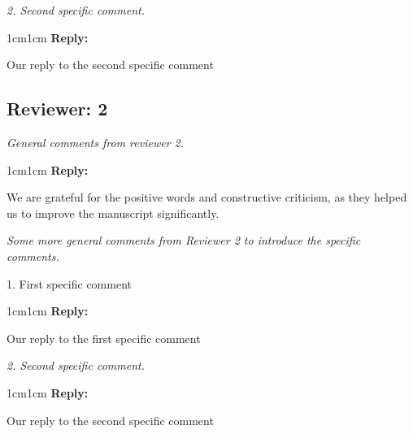 \documentclass[11pt]{article}
\newenvironment{reviewer}{\itshape}{}
\newenvironment{reply}{%
    \begin{adjustwidth}{1cm}{1cm}%
    \color{grayreply}\textbf{Reply:\ }%
    \ignorespaces%
}{\end{adjustwidth}}
\begin{document}
\begin{minipage}{\linewidth}
    \begin{reviewer}
        2. Second specific comment.
    \end{reviewer}

    \begin{reply}
        Our reply to the second specific comment
    \end{reply}
\end{minipage}

\subsection*{Reviewer: 2}

\begin{minipage}{\linewidth}
    \begin{reviewer}
        General comments from reviewer 2.
    \end{reviewer}

    \begin{reply}
        We are grateful for the positive words and constructive criticism, as they helped us to improve the manuscript significantly.
    \end{reply}
\end{minipage}


\begin{minipage}{\linewidth}
    \begin{reviewer}
        Some more general comments from Reviewer 2 to introduce the specific comments.

        1. First specific comment
    \end{reviewer}

    \begin{reply}
        Our reply to the first specific comment
    \end{reply}
\end{minipage}


\begin{minipage}{\linewidth}
    \begin{reviewer}
        2. Second specific comment.
    \end{reviewer}

    \begin{reply}
        Our reply to the second specific comment
    \end{reply}
\end{minipage}
\end{document}
